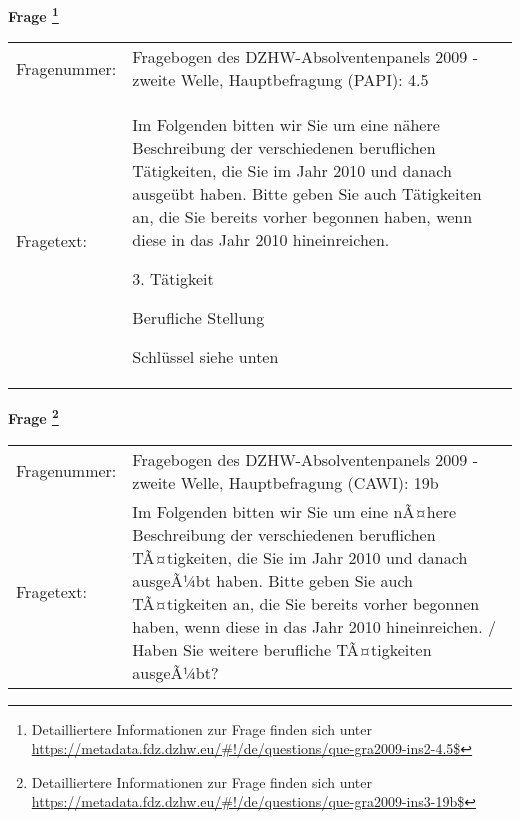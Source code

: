 				\vspace*{0.5cm}
                \noindent\textbf{Frage
	                \footnote{Detailliertere Informationen zur Frage finden sich unter
		              \url{https://metadata.fdz.dzhw.eu/\#!/de/questions/que-gra2009-ins2-4.5$}}}\\
				\begin{tabularx}{\hsize}{@{}lX}
					Fragenummer: &
					  Fragebogen des DZHW-Absolventenpanels 2009 - zweite Welle, Hauptbefragung (PAPI):
					  4.5
 \\
					Fragetext: & Im Folgenden bitten wir Sie um eine nähere Beschreibung der verschiedenen beruflichen Tätigkeiten, die Sie im Jahr 2010 und danach ausgeübt haben. Bitte geben Sie auch Tätigkeiten an, die Sie bereits vorher begonnen haben, wenn diese in das Jahr 2010 hineinreichen.\par  3. Tätigkeit\par  Berufliche Stellung\par  Schlüssel siehe unten \\
				\end{tabularx}
				\vspace*{0.5cm}
                \noindent\textbf{Frage
	                \footnote{Detailliertere Informationen zur Frage finden sich unter
		              \url{https://metadata.fdz.dzhw.eu/\#!/de/questions/que-gra2009-ins3-19b$}}}\\
				\begin{tabularx}{\hsize}{@{}lX}
					Fragenummer: &
					  Fragebogen des DZHW-Absolventenpanels 2009 - zweite Welle, Hauptbefragung (CAWI):
					  19b
 \\
					Fragetext: & Im Folgenden bitten wir Sie um eine nÃ¤here Beschreibung der verschiedenen beruflichen TÃ¤tigkeiten, die Sie im Jahr 2010 und danach ausgeÃ¼bt haben. Bitte geben Sie auch TÃ¤tigkeiten an, die Sie bereits vorher begonnen haben, wenn diese in das Jahr 2010 hineinreichen. / Haben Sie weitere berufliche TÃ¤tigkeiten ausgeÃ¼bt? \\
				\end{tabularx}





